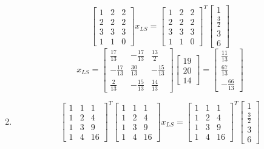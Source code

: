 \documentclass[english,onecolumn]{IEEEtran}
\begin{document}
\begin{enumerate}
$$\begin{bmatrix}
    1 & 2 & 2\\
    2 & 2 & 2\\
    3 & 3 & 3\\
    1 & 1 & 0
    \end{bmatrix}x_{LS}=\begin{bmatrix}
    1 & 2 & 2\\
    2 & 2 & 2\\
    3 & 3 & 3\\
    1 & 1 & 0
    \end{bmatrix}^T\begin{bmatrix}  1 \\ \frac{3}{2} \\ 3\\6\end{bmatrix}$$
    $$x_{LS}=\begin{bmatrix}
    \frac{17}{13} & -\frac{17}{13} & \frac{13}{2}\\
    -\frac{17}{13} & \frac{30}{13} & -\frac{15}{13}\\
    \frac{2}{13} & -\frac{15}{13} & \frac{14}{13}
    \end{bmatrix}\begin{bmatrix} 19 \\ 20\\ 14\end{bmatrix} =\begin{bmatrix}\frac{11}{13} \\ \frac{67}{13}\\ -\frac{66}{13}\end{bmatrix}$$
    \item  $$\begin{bmatrix}
    1 & 1 & 1\\
    1 & 2 & 4\\
    1 & 3 & 9\\
    1 & 4 & 16
    \end{bmatrix}^T\begin{bmatrix}
    1 & 1 & 1\\
    1 & 2 & 4\\
    1 & 3 & 9\\
    1 & 4 & 16
    \end{bmatrix}x_{LS}=\begin{bmatrix}
    1 & 1 & 1\\
    1 & 2 & 4\\
    1 & 3 & 9\\
    1 & 4 & 16
    \end{bmatrix}^T\begin{bmatrix}  1 \\ \frac{3}{2} \\ 3\\6\end{bmatrix}$$

\end{enumerate}
\end{document}
